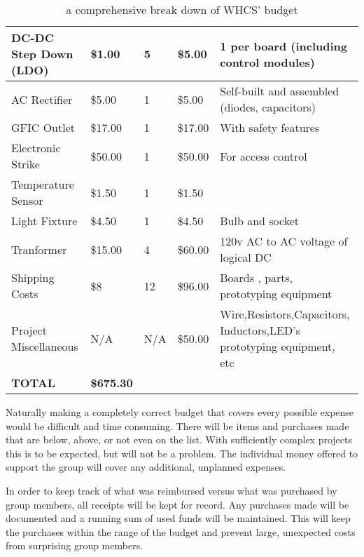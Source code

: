 \begin{table}[H]
{\begin{tabular}{|l|l|l|l|b{5cm}|}
{\color{black} DC{}-DC Step Down (LDO)} &
{\color{black} \$1.00} &
{\color{black} 5} &
{\color{black} \$5.00} &
{\color{black} 1 per board (including control modules)}\\\hline
{\color{black} AC Rectifier} &
{\color{black} \$5.00} &
{\color{black} 1} &
{\color{black} \$5.00} &
{\color{black} Self{}-built and assembled (diodes, capacitors)}\\\hline
{\color{black} GFIC Outlet} &
{\color{black} \$17.00} &
{\color{black} 1} &
{\color{black} \$17.00} &
{\color{black} With safety features}\\\hline
{\color{black} Electronic Strike} &
{\color{black} \$50.00} &
{\color{black} 1} &
{\color{black} \$50.00} &
{\color{black} For access control}\\\hline
{\color{black} Temperature Sensor} &
{\color{black} \$1.50} &
{\color{black} 1} &
{\color{black} \$1.50} &
\\\hline
{\color{black} Light Fixture} &
{\color{black} \$4.50} &
{\color{black} 1} &
{\color{black} \$4.50} &
{\color{black} Bulb and socket}\\\hline
{\color{black} Tranformer} &
{\color{black} \$15.00} &
{\color{black} 4} &
{\color{black} \$60.00} &
{\color{black} 120v AC to AC voltage of logical DC}\\\hline
{\color{black} Shipping Costs} &
{\color{black} \$8} &
{\color{black} 12} &
{\color{black} \$96.00} &
{\color{black} Boards , parts, prototyping equipment}\\\hline
{\color{black} Project Miscellaneous} &
{\color{black} N/A} &
{\color{black} N/A} &
{\color{black} \$50.00} &
{\color{black} Wire,Resistors,Capacitors, Inductors,LED{}'s prototyping equipment, etc}\\\hline
{\color{black} \textbf{TOTAL}} &
{\color{black} \textbf{\$675.30}} &
 &
 &
\\\hline
\end{tabular}
}
\caption{a comprehensive break down of WHCS' budget}
\label{tab:budget}
\end{table}

Naturally making a completely correct budget that covers every possible expense
would be difficult and time consuming. There will be items and purchases made
that are below, above, or not even on the list. With sufficiently complex
projects this is to be expected, but will not be a problem. The individual
money offered to support the group will cover any additional, unplanned
expenses.

In order to keep track of what was reimbursed versus what was purchased by
group members, all receipts will be kept for record. Any purchases made will be
documented and a running sum of used funds will be maintained. This will keep
the purchases within the range of the budget and prevent large, unexpected
costs from surprising group members.

